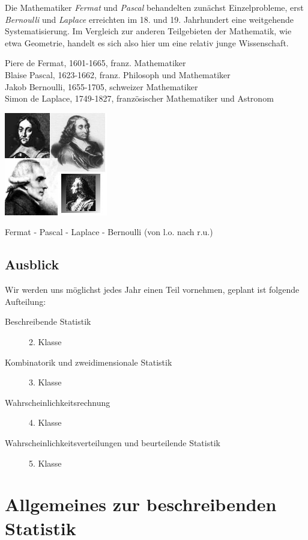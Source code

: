 \documentclass[a4paper, twoside, parskip, 10pt, smallheadings]{scrbook}
\theoremstyle{plain}
\theoremstyle{definition}
\begin{document}
\begin{minipage}{10cm}Die Mathematiker {\it Fermat} und {\it
Pascal} behandelten
zun\"{a}chst Einzelprobleme, erst {\it Bernoulli} und {\it Laplace} erreichten im 18. und 19. Jahrhundert eine weitgehende
Systematisierung. Im Vergleich zur anderen Teilgebieten der Mathematik, wie etwa Geometrie, handelt
es sich also hier um eine relativ junge Wissenschaft.

Piere de Fermat, 1601-1665, franz. Mathematiker\\Blaise Pascal, 1623-1662, franz. Philosoph und Mathematiker\\Jakob Bernoulli, 1655-1705, schweizer
Mathematiker\\Simon de Laplace, 1749-1827, franz\"{o}sischer
Mathematiker und Astronom
\end{minipage}
\begin{minipage}{5cm}
\includegraphics[height=4.5cm]{2te/beschreibendestatistik/bilder/mathe_stoch.jpg}

Fermat - Pascal - Laplace - Bernoulli (von l.o. nach r.u.)
\end{minipage}

\subsection*{Ausblick}
Wir werden uns möglichst jedes Jahr einen Teil vornehmen, geplant ist folgende Aufteilung:
\begin{description}
\item [Beschreibende Statistik] 2. Klasse
\item [Kombinatorik und zweidimensionale Statistik] 3. Klasse
\item [Wahrscheinlichkeitsrechnung] 4. Klasse
\item [Wahrscheinlichkeitsverteilungen und beurteilende Statistik] 5. Klasse
\end{description}



\section{Allgemeines zur beschreibenden Statistik}
\end{document}
